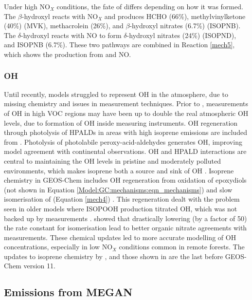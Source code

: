       Under high NO$_X$ conditions, the fate of \roo differs depending on how it was formed.
      The $\beta$-hydroxyl reacts with NO$_X$ and produces HCHO (66\%), methylvinylketone (40\%) (MVK), methacrolein (26\%), and $\beta$-hydroxyl nitrates (6.7\%) (ISOPNB).
      The $\delta$-hydroxyl reacts with NO to form $\delta$-hydroxyl nitrates (24\%) (ISOPND), and ISOPNB (6.7\%).
      These two pathways are combined in Reaction \ref{mech5}, which shows the production from \roo and NO.
      
      
    \subsubsection{OH}
    
      Until recently, models struggled to represent OH in the atmosphere, due to missing chemistry and issues in measurement techniques.
      Prior to \textcite{Mao2012}, measurements of OH in high VOC regions may have been up to double the real atmospheric OH levels, due to formation of OH inside measuring instruments.
      OH regeneration through photolysis of HPALDs in areas with high isoprene emissions are included from \textcite{Peeters2010}.
      Photolysis of photolabile peroxy-acid-aldehydes generates OH, improving model agreement with continental observations.
      OH and HPALD interactions are central to maintaining the OH levels in pristine and moderately polluted environments, which makes isoprene both a source and sink of OH \parencite{Peeters2010,Taraborrelli2012}.
      Isoprene chemistry in GEOS-Chem includes OH regeneration from oxidation of epoxydiols (not shown in Equation \ref{Model:GC:mechanisms:eqn_mechanisms}) and slow isomerisation of \roo (Equation \ref{mech4}) \parencite{Mao2013}.
      This regeneration dealt with the problem seen in older models where ISOPOOH production titrated OH, which was not backed up by measurements \parencite{Paulot2009b,Mao2013}.
      \textcite{Mao2013} showed that drastically lowering (by a factor of 50) the rate constant for \roo isomerisation lead to better organic nitrate agreements with measurements.%
      These chemical updates led to more accurate modelling of OH concentrations, especially in low NO$_X$ conditions common in remote forests.
      The updates to isoprene chemistry by \textcite{Mao2013}, and those shown in \textcite{Crounse2011,Crounse2012} are the last before GEOS-Chem version 11.

  
  \subsection{Emissions from MEGAN}
    \label{Model:GC:MEGAN}
    
